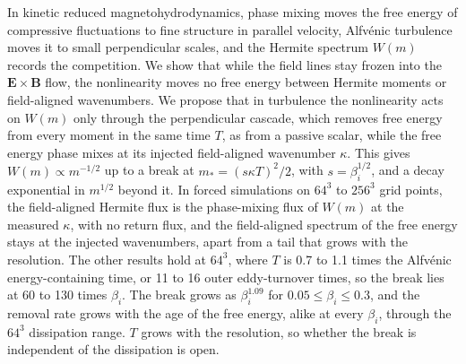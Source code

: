 In kinetic reduced magnetohydrodynamics, phase mixing moves the free energy of compressive fluctuations to fine structure in parallel velocity, Alfv\'enic turbulence moves it to small perpendicular scales, and the Hermite spectrum $W(m)$ records the competition. We show that while the field lines stay frozen into the $\boldsymbol E\times\boldsymbol B$ flow, the nonlinearity moves no free energy between Hermite moments or field-aligned wavenumbers. We propose that in turbulence the nonlinearity acts on $W(m)$ only through the perpendicular cascade, which removes free energy from every moment in the same time $T$, as from a passive scalar, while the free energy phase mixes at its injected field-aligned wavenumber $\kappa$. This gives $W(m)\propto m^{-1/2}$ up to a break at $m_*=(s\kappa T)^2/2$, with $s=\beta_i^{1/2}$, and a decay exponential in $m^{1/2}$ beyond it. In forced simulations on $64^3$ to $256^3$ grid points, the field-aligned Hermite flux is the phase-mixing flux of $W(m)$ at the measured $\kappa$, with no return flux, and the field-aligned spectrum of the free energy stays at the injected wavenumbers, apart from a tail that grows with the resolution. The other results hold at $64^3$, where $T$ is 0.7 to 1.1 times the Alfv\'enic energy-containing time, or 11 to 16 outer eddy-turnover times, so the break lies at 60 to 130 times $\beta_i$. The break grows as $\beta_i^{1.09}$ for $0.05\le\beta_i\le0.3$, and the removal rate grows with the age of the free energy, alike at every $\beta_i$, through the $64^3$ dissipation range. $T$ grows with the resolution, so whether the break is independent of the dissipation is open.
